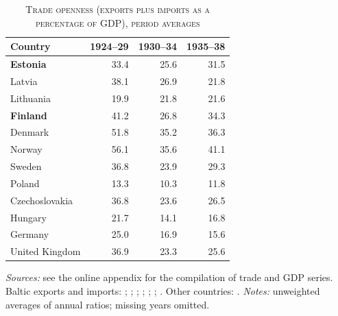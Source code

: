 \begin{table}[htbp]
\centering\small
\caption[Trade openness (exports plus imports as a percentage of GDP), period averages]{\textsc{Trade openness (exports plus imports as a percentage of GDP), period averages}}
\label{tab:trade}
\begin{threeparttable}
\begin{tabular}{lrrr}
\toprule
Country & 1924--29 & 1930--34 & 1935--38 \\
\midrule
\textbf{Estonia} & 33.4 & 25.6 & 31.5 \\
Latvia & 38.1 & 26.9 & 21.8 \\
Lithuania & 19.9 & 21.8 & 21.6 \\
\textbf{Finland} & 41.2 & 26.8 & 34.3 \\
Denmark & 51.8 & 35.2 & 36.3 \\
Norway & 56.1 & 35.6 & 41.1 \\
Sweden & 36.8 & 23.9 & 29.3 \\
Poland & 13.3 & 10.3 & 11.8 \\
Czechoslovakia & 36.8 & 23.6 & 26.5 \\
Hungary & 21.7 & 14.1 & 16.8 \\
Germany & 25.0 & 16.9 & 15.6 \\
United Kingdom & 36.9 & 23.3 & 25.6 \\
\bottomrule
\end{tabular}
\begin{tablenotes}
\footnotesize
\textit{Sources:} see the online appendix for the compilation of trade and GDP series. Baltic exports and imports: \cite{lidaexportsee}; \cite{lidaimportsee}; \cite{lidaexportslv}; \cite{lidaimportslv}; \cite{lidaexp}; \cite{lidaimp}; \cite[123, 161]{balticstates1938}. Other countries: \cite{worldtrade1949}. \textit{Notes:} unweighted averages of annual ratios; missing years omitted.
\end{tablenotes}
\end{threeparttable}
\end{table}

